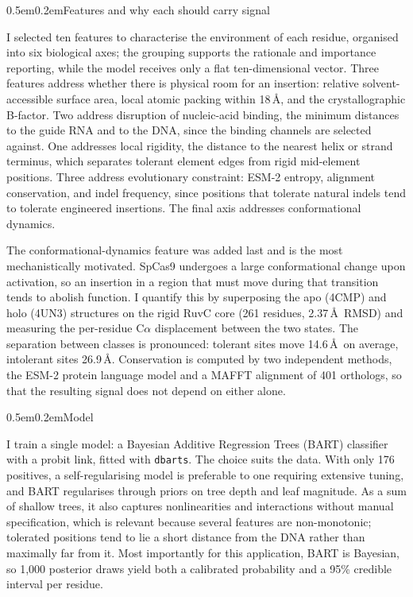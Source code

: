 \documentclass[10pt]{article}
\makeatletter
\renewcommand\section{\@startsection{section}{1}{0pt}%
  {0.5em}{0.2em}{\normalsize\bfseries}}
\makeatother
\begin{document}
\section{Features and why each should carry signal}

I selected ten features to characterise the environment of each residue, organised into six
biological axes; the grouping supports the rationale and importance reporting, while the model
receives only a flat ten-dimensional vector. Three features address whether there is physical room
for an insertion: relative solvent-accessible surface area, local atomic packing within 18\,\AA,
and the crystallographic B-factor. Two address disruption of nucleic-acid binding, the minimum
distances to the guide RNA and to the DNA, since the binding channels are selected against. One
addresses local rigidity, the distance to the nearest helix or strand terminus, which separates
tolerant element edges from rigid mid-element positions. Three address evolutionary constraint:
ESM-2 entropy, alignment conservation, and indel frequency, since positions that tolerate natural
indels tend to tolerate engineered insertions. The final axis addresses conformational dynamics.

The conformational-dynamics feature was added last and is the most mechanistically motivated.
SpCas9 undergoes a large conformational change upon activation, so an insertion in a region that
must move during that transition tends to abolish function. I quantify this by superposing the apo
(4CMP) and holo (4UN3) structures on the rigid RuvC core (261 residues, 2.37\,\AA\ RMSD) and
measuring the per-residue C$\alpha$ displacement between the two states. The separation between
classes is pronounced: tolerant sites move 14.6\,\AA\ on average, intolerant sites 26.9\,\AA.
Conservation is computed by two independent methods, the ESM-2 protein language model and a MAFFT
alignment of 401 orthologs, so that the resulting signal does not depend on either alone.

\section{Model}

I train a single model: a Bayesian Additive Regression Trees (BART) classifier with a probit link,
fitted with \texttt{dbarts}. The choice suits the data. With only 176 positives, a
self-regularising model is preferable to one requiring extensive tuning, and BART regularises
through priors on tree depth and leaf magnitude. As a sum of shallow trees, it also captures
nonlinearities and interactions without manual specification, which is relevant because several
features are non-monotonic; tolerated positions tend to lie a short distance from the DNA rather
than maximally far from it. Most importantly for this application, BART is Bayesian, so 1{,}000
posterior draws yield both a calibrated probability and a 95\% credible interval per residue.
\end{document}
